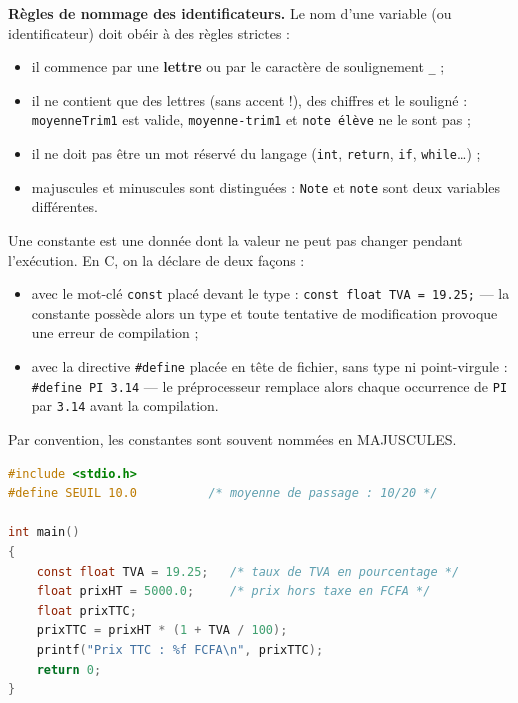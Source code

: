 \documentclass[11pt]{article}
\newcommand{\cle}[1]{{\popxbold\color{popdark}#1}}
\begin{document}
\textbf{Règles de nommage des identificateurs.} Le nom d'une variable (ou \cle{identificateur}) doit obéir à des règles strictes :
\begin{itemize}
\item il commence par une \textbf{lettre} ou par le caractère de soulignement \texttt{\_} ;
\item il ne contient que des lettres (sans accent !), des chiffres et le souligné : \texttt{moyenneTrim1} est valide, \texttt{moyenne-trim1} et \texttt{note élève} ne le sont pas ;
\item il ne doit pas être un \cle{mot réservé} du langage (\texttt{int}, \texttt{return}, \texttt{if}, \texttt{while}\ldots) ;
\item majuscules et minuscules sont distinguées : \texttt{Note} et \texttt{note} sont deux variables différentes.
\end{itemize}

\begin{definition}[Constante]
Une \cle{constante} est une donnée dont la valeur ne peut pas changer pendant l'exécution. En C, on la déclare de deux façons :
\begin{itemize}
\item avec le mot-clé \texttt{const} placé devant le type : \texttt{const float TVA = 19.25;} — la constante possède alors un type et toute tentative de modification provoque une erreur de compilation ;
\item avec la directive \texttt{\#define} placée en tête de fichier, sans type ni point-virgule : \texttt{\#define PI 3.14} — le préprocesseur remplace alors chaque occurrence de \texttt{PI} par \texttt{3.14} avant la compilation.
\end{itemize}
Par convention, les constantes sont souvent nommées en MAJUSCULES.
\end{definition}

\begin{exemplebox}
\begin{lstlisting}[language=C]
#include <stdio.h>
#define SEUIL 10.0          /* moyenne de passage : 10/20 */

int main()
{
    const float TVA = 19.25;   /* taux de TVA en pourcentage */
    float prixHT = 5000.0;     /* prix hors taxe en FCFA */
    float prixTTC;
    prixTTC = prixHT * (1 + TVA / 100);
    printf("Prix TTC : %f FCFA\n", prixTTC);
    return 0;
}
\end{lstlisting}
\end{exemplebox}
\end{document}
